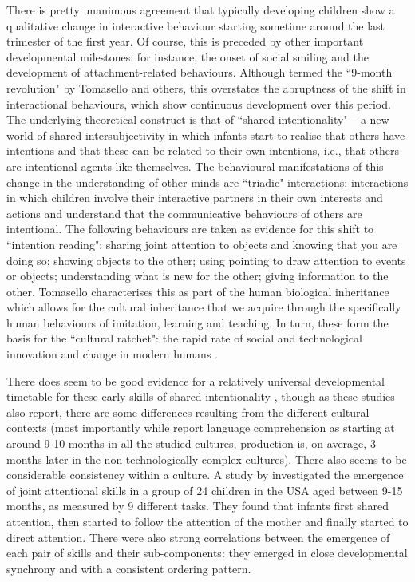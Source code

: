 \documentclass[output=paper]{langsci/langscibook}
\begin{document}
 There is pretty unanimous agreement that typically developing children show a qualitative change in interactive behaviour starting sometime around the last trimester of the first year.  Of course, this is preceded by other important developmental milestones: for instance, the onset of social smiling and the development of attachment-related behaviours.  Although termed the ``9-month revolution" by Tomasello and others, this overstates the abruptness of the shift in interactional behaviours, which show continuous development over this period.  The underlying theoretical construct is that of ``shared intentionality" -- a new world of shared intersubjectivity in which infants start to realise that others have intentions and that these can be related to their own intentions, i.e., that others are intentional agents like themselves.  The behavioural manifestations of this change in the understanding of other minds are ``triadic" interactions: interactions in which children involve their interactive partners in their own interests and actions and understand that the communicative behaviours of others are intentional.   The following behaviours are taken as evidence for this shift to ``intention reading": sharing joint attention to objects and knowing that you are doing so; showing objects to the other; using pointing to draw attention to events or objects; understanding what is new for the other; giving information to the other.  Tomasello characterises this as part of the human biological inheritance which allows for the cultural inheritance that we acquire through the specifically human behaviours of imitation, learning and teaching.  In turn, these form the basis for the ``cultural ratchet": the rapid rate of social and technological innovation and change in modern humans \citep[6]{Tomasello1999}.   

There does seem to be good evidence for a relatively universal developmental timetable for these early skills of shared intentionality \citep{Brown2011,Callaghan2011,Liszkowski2012,Lieven2013}, though as these studies also report, there are some differences resulting from the different cultural contexts (most importantly while \citeauthor{Callaghan2011} report language comprehension as starting at around 9-10 months in all the studied cultures, production is, on average, 3 months later in the non-technologically complex  cultures).  There also seems to be considerable consistency within a culture. A study by \citet{Carpenter1998} investigated the emergence of joint attentional skills in a group of 24 children in the USA aged between 9-15 months, as measured by 9 different tasks. They found that infants first shared attention, then started to follow the attention of the mother and finally started to direct attention.  There were also strong correlations between the emergence of each pair of skills and their sub-components: they emerged in close developmental synchrony and with a consistent ordering pattern.
\end{document}
